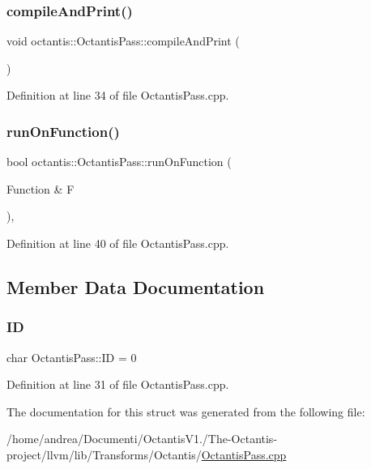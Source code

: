 \subsubsection{\texorpdfstring{compile\+And\+Print()}{compileAndPrint()}}
{\footnotesize\ttfamily void octantis\+::\+Octantis\+Pass\+::compile\+And\+Print (\begin{DoxyParamCaption}{ }\end{DoxyParamCaption})\hspace{0.3cm}{\ttfamily [inline]}}



Definition at line 34 of file Octantis\+Pass.\+cpp.

\mbox{\label{structoctantis_1_1OctantisPass_a2d156c9326f2eaf75969e34aa09df2e5}} 
\subsubsection{\texorpdfstring{run\+On\+Function()}{runOnFunction()}}
{\footnotesize\ttfamily bool octantis\+::\+Octantis\+Pass\+::run\+On\+Function (\begin{DoxyParamCaption}\item[{Function \&}]{F }\end{DoxyParamCaption})\hspace{0.3cm}{\ttfamily [inline]}, {\ttfamily [override]}}



Definition at line 40 of file Octantis\+Pass.\+cpp.



\subsection{Member Data Documentation}
\mbox{\label{structoctantis_1_1OctantisPass_a71e0902b7f244b6aa98ef9f3d34c8637}} 
\subsubsection{\texorpdfstring{ID}{ID}}
{\footnotesize\ttfamily char Octantis\+Pass\+::\+ID = 0\hspace{0.3cm}{\ttfamily [static]}}



Definition at line 31 of file Octantis\+Pass.\+cpp.



The documentation for this struct was generated from the following file\+:\begin{DoxyCompactItemize}
\item 
/home/andrea/\+Documenti/\+Octantis\+V1./\+The-\/\+Octantis-\/project/llvm/lib/\+Transforms/\+Octantis/\hyperlink{OctantisPass_8cpp}{Octantis\+Pass.\+cpp}\end{DoxyCompactItemize}
